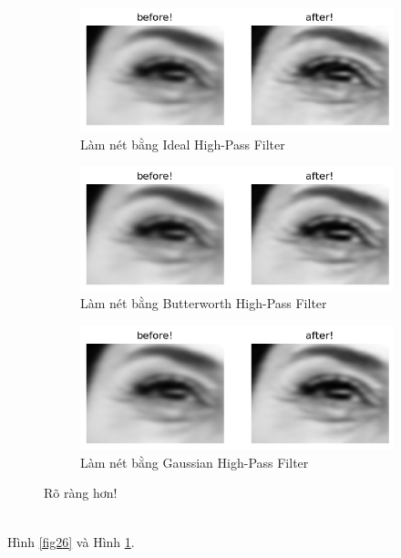 \documentclass{article}
\begin{document}
        \begin{figure}
            \centering
            \begin{subfigure}[b]{0.9\linewidth}
                \includegraphics[width = \linewidth]{fo25a.png}
                \caption{Làm nét bằng Ideal High-Pass Filter}
            \end{subfigure}
            \begin{subfigure}[b]{0.9\linewidth}
                \includegraphics[width=\linewidth]{fo25b.png}
                \caption{Làm nét bằng Butterworth High-Pass Filter}
            \end{subfigure}
            \begin{subfigure}[b]{0.9\linewidth}
                \includegraphics[width=\linewidth]{fo25c.png}
                \caption{Làm nét bằng Gaussian High-Pass Filter}
            \end{subfigure}
            \caption{Rõ ràng hơn!}
            \label{fig27}
        \end{figure}
        \\Hình \ref{fig26} và Hình \ref{fig27}.
\end{document}

